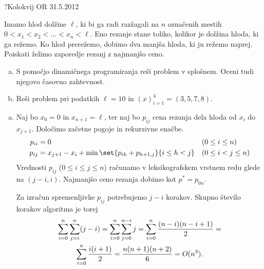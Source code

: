 \begin{naloga}{?}{Kolokvij OR 31.5.2012}
\begin{vprasanje}
Imamo hlod dolžine $\ell$,
ki bi ga radi razžagali na $n$ označenih mestih
$0 < x_1 < x_2 < \dots < x_n < \ell$.
Eno rezanje stane toliko, kolikor je dolžina hloda, ki ga režemo.
Ko hlod prerežemo, dobimo dva manjša hloda, ki ju režemo naprej.
Poiskati želimo zaporedje rezanj z najmanjšo ceno.
\begin{enumerate}[(a)]
\item S pomočjo dinamičnega programiranja reši problem v splošnem.
Oceni tudi njegovo časovno zahtevnost.
\item Reši problem pri podatkih $\ell = 10$ in $(x)_{i=1}^4 = (3, 5, 7, 8)$.
\end{enumerate}
\end{vprasanje}

\begin{odgovor}
\begin{enumerate}[(a)]
\item Naj bo $x_0 = 0$ in $x_{n+1} = \ell$,
ter naj bo $p_{ij}$ cena rezanja dela hloda od $x_i$ do $x_{j+1}$.
Določimo začetne pogoje in rekurzivne enačbe.
\begin{align*}
p_{ii} &= 0 && (0 \le i \le n) \\
p_{ij} &= x_{j+1} - x_i + \min\set{p_{ih} + p_{h+1,j}}{i \le h < j}
&& (0 \le i < j \le n)
\end{align*}
Vrednosti $p_{ij}$ ($0 \le i \le j \le n$)
računamo v leksikografskem vrstnem redu glede na $(j-i, i)$.
Najmanjšo ceno rezanja dobimo kot $p^* = p_{0n}$.

Za izračun spremenljivke $p_{ij}$ potrebujemo $j-i$ korakov.
Skupno število korakov algoritma je torej
\begin{multline*}
\sum_{i=0}^n \sum_{j=i}^n (j-i) = \sum_{i=0}^n \sum_{j=0}^{n-i} j =
\sum_{i=0}^n {(n-i)(n-i+1) \over 2} = \\
\sum_{i=0}^n {i(i+1) \over 2} = {n(n+1)(n+2) \over 6} = O(n^3) .
\end{multline*}


\end{enumerate}
\end{odgovor}
\end{naloga}
